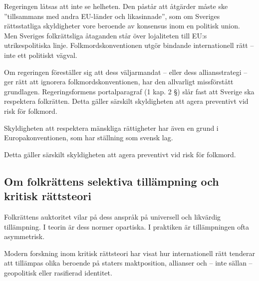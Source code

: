 Regeringen låtsas att inte se helheten. Den påstår att åtgärder måste ske ”tillsammans med andra EU-länder och likasinnade”, som om Sveriges rättsstatliga skyldigheter vore beroende av konsensus inom en politisk union. Men Sveriges folkrättsliga åtaganden står över lojaliteten till EU:s utrikespolitiska linje. Folkmordskonventionen utgör bindande internationell rätt – inte ett politiskt vägval.

Om regeringen föreställer sig att dess väljarmandat – eller dess alliansstrategi – ger rätt att ignorera folkmordskonventionen, har den allvarligt missförstått grundlagen.  
Regeringsformens portalparagraf (1 kap. 2 §) slår fast att Sverige ska respektera folkrätten. Detta gäller särskilt skyldigheten att agera preventivt vid risk för folkmord.


Skyldigheten att respektera mänskliga rättigheter har även en grund i Europakonventionen, som har ställning som svensk lag.


Detta gäller särskilt skyldigheten att agera preventivt vid risk för folkmord.



\subsection*{Om folkrättens selektiva tillämpning och kritisk rättsteori}

Folkrättens auktoritet vilar på dess anspråk på universell och likvärdig tillämpning. I teorin är dess normer opartiska. I praktiken är tillämpningen ofta asymmetrisk.

Modern forskning inom kritisk rättsteori har visat hur internationell rätt tenderar att tillämpas olika beroende på staters maktposition, allianser och – inte sällan – geopolitisk eller rasifierad identitet.  

